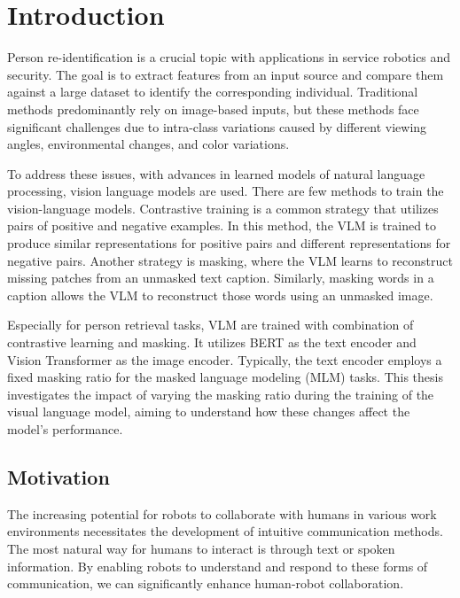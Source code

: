 \chapter{Introduction}
Person re-identification is a crucial topic with applications in service robotics and security. The goal is to extract features from an input source and compare them against a large dataset to identify the corresponding individual. Traditional methods predominantly rely on image-based inputs, but these methods face significant challenges due to intra-class variations caused by different viewing angles, environmental changes, and color variations.

To address these issues, with advances in learned models of natural language processing, vision language models are used. There are few methods to train the vision-language models. 
Contrastive training is a common strategy that utilizes pairs of positive and negative examples. In this method, the VLM is trained to produce similar representations for positive pairs and different representations for negative pairs. Another strategy is masking, where the VLM learns to reconstruct missing patches from an unmasked text caption. Similarly, masking words in a caption allows the VLM to reconstruct those words using an unmasked image.


Especially for person retrieval tasks, VLM are trained with combination of contrastive learning and masking. It utilizes BERT as the text encoder and Vision Transformer as the image encoder. Typically, the text encoder employs a fixed masking ratio for the masked language modeling (MLM) tasks. This thesis investigates the impact of varying the masking ratio during the training of the visual language model, aiming to understand how these changes affect the model's performance.

\section{Motivation}
The increasing potential for robots to collaborate with humans in various work environments necessitates the development of intuitive communication methods. The most natural way for humans to interact is through text or spoken information. By enabling robots to understand and respond to these forms of communication, we can significantly enhance human-robot collaboration.

